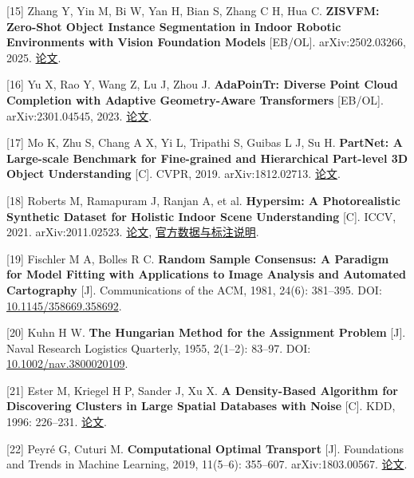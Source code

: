 \documentclass[UTF8,fontset=fandol]{ctexart}
\begin{document}
[15] Zhang Y, Yin M, Bi W, Yan H, Bian S, Zhang C H, Hua C. \textbf{ZISVFM: Zero-Shot Object Instance Segmentation in Indoor Robotic Environments with Vision Foundation Models} [EB/OL]. arXiv:2502.03266, 2025. \href{https://arxiv.org/abs/2502.03266}{论文}.



[16] Yu X, Rao Y, Wang Z, Lu J, Zhou J. \textbf{AdaPoinTr: Diverse Point Cloud Completion with Adaptive Geometry-Aware Transformers} [EB/OL]. arXiv:2301.04545, 2023. \href{https://arxiv.org/abs/2301.04545}{论文}.



[17] Mo K, Zhu S, Chang A X, Yi L, Tripathi S, Guibas L J, Su H. \textbf{PartNet: A Large-scale Benchmark for Fine-grained and Hierarchical Part-level 3D Object Understanding} [C]. CVPR, 2019. arXiv:1812.02713. \href{https://arxiv.org/abs/1812.02713}{论文}.



[18] Roberts M, Ramapuram J, Ranjan A, et al. \textbf{Hypersim: A Photorealistic Synthetic Dataset for Holistic Indoor Scene Understanding} [C]. ICCV, 2021. arXiv:2011.02523. \href{https://arxiv.org/abs/2011.02523}{论文}, \href{https://github.com/apple/ml-hypersim}{官方数据与标注说明}.



[19] Fischler M A, Bolles R C. \textbf{Random Sample Consensus: A Paradigm for Model Fitting with Applications to Image Analysis and Automated Cartography} [J]. Communications of the ACM, 1981, 24(6): 381–395. DOI: \href{https://doi.org/10.1145/358669.358692}{10.1145/358669.358692}.



[20] Kuhn H W. \textbf{The Hungarian Method for the Assignment Problem} [J]. Naval Research Logistics Quarterly, 1955, 2(1–2): 83–97. DOI: \href{https://doi.org/10.1002/nav.3800020109}{10.1002/nav.3800020109}.



[21] Ester M, Kriegel H P, Sander J, Xu X. \textbf{A Density-Based Algorithm for Discovering Clusters in Large Spatial Databases with Noise} [C]. KDD, 1996: 226–231. \href{https://www2.cs.sfu.ca/\textasciitilde{}ester/papers/kdd-96.pdf}{论文}.



[22] Peyré G, Cuturi M. \textbf{Computational Optimal Transport} [J]. Foundations and Trends in Machine Learning, 2019, 11(5–6): 355–607. arXiv:1803.00567. \href{https://arxiv.org/abs/1803.00567}{论文}.
\end{document}
